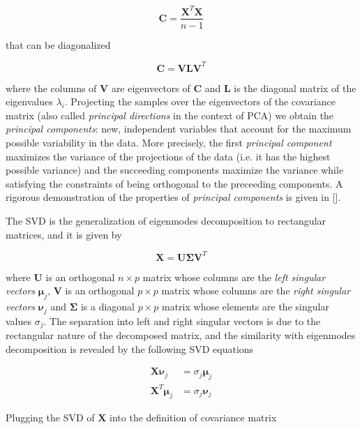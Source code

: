 \documentclass[notitlepage]{revtex4-1}
\begin{document}
\begin{equation}
\mathbf{C} = \frac{\mathbf{X}^T \mathbf{X}}{n-1}
\end{equation}

that can be diagonalized

\begin{equation}
\mathbf{C} = \mathbf{V L V}^T
\end{equation}

where the columns of \(\mathbf{V}\) are eigenvectors of \(\mathbf{C}\) and \(\mathbf{L}\) is the diagonal matrix of the eigenvalues \(\lambda_i\). Projecting the samples over the eigenvectors of the covariance matrix (also called \textit{principal directions} in the context of PCA) we obtain the \textit{principal components}: new, independent variables that account for the maximum possible variability in the data. More precisely, the first \textit{principal component} maximizes the variance of the projections of the data (i.e. it has the highest possible variance) and the succeeding components maximize the variance while satisfying the constraints of being orthogonal to the preceeding components. A rigorous demonstration of the properties of \textit{principal components} is given in [].

The SVD is the generalization of eigenmodes decomposition to rectangular matrices, and it is given by

\begin{equation}
\mathbf{X} = \mathbf{U \Sigma} \mathbf{V}^T
\end{equation}

where \(\mathbf{U}\) is an orthogonal \(n \times p\)  matrix whose columns are the \textit{left singular vectors} \(\mathbf{\mu}_j \), \(\mathbf{V}\) is an orthogonal \(p \times p\) matrix whose columns are the \textit{right singular vectors} \( \mathbf{\nu}_j \) and \( \mathbf{\Sigma} \) is a diagonal \(p \times p\) matrix whose elements are the singular values \(\sigma_j\). The separation into left and right singular vectors is due to the rectangular nature of the decomposed matrix, and the similarity with eigenmodes decomposition is revealed by the following SVD equations

\begin{align}
\mathbf{X} \mathbf{\nu}_j & = \sigma_j \mathbf{\mu}_j \\
\mathbf{X}^T \mathbf{\mu}_j & = \sigma_j \mathbf{\nu}_j
\end{align}

Plugging the SVD of \(\mathbf{X}\) into the definition of covariance matrix
\end{document}
